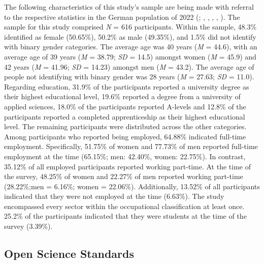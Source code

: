 \documentclass[
  12pt,
  a4paper,
  twoside]{article}
\begin{document}
The following characteristics of this study's sample are being made with referral to the respective statistics in the German population of 2022 (; , , , , ).
The sample for this study comprised \emph{N} = 616 participants. Within the sample, 48.3\% identified as female (50.65\%), 50.2\% as male (49.35\%), and 1.5\% did not identify with binary gender categories. The average age was 40 years (\emph{M} = 44.6), with an average age of 39 years (\emph{M} = 38.79; \emph{SD} = 14.5) amongst women (\emph{M} = 45.9) and 42 years (\emph{M} = 41.96; \emph{SD} = 14.23) amongst men (\emph{M} = 43.2). The average age of people not identifying with binary gender was 28 years (\emph{M} = 27.63; \emph{SD} = 11.0).
Regarding education, 31.9\% of the participants reported a university degree as their highest educational level, 19.6\% reported a degree from a university of applied sciences, 18.0\% of the participants reported A-levels and 12.8\% of the participants reported a completed apprenticeship as their highest educational level. The remaining participants were distributed across the other categories.
Among participants who reported being employed, 64.88\% indicated full-time employment.
Specifically, 51.75\% of women and 77.73\% of men reported full-time employment at the time (65.15\%; men: 42.40\%, women: 22.75\%).
In contrast, 35.12\% of all employed participants reported working part-time.
At the time of the survey, 48.25\% of women and 22.27\% of men reported working part-time (28.22\%;men = 6.16\%; women = 22.06\%).
Additionally, 13.52\% of all participants indicated that they were not employed at the time (6.63\%).
The study encompassed every sector within the occupational classification at least once. 25.2\% of the participants indicated that they were students at the time of the survey (3.39\%).

\subsection{Open Science Standards}\label{open-science-standards}
\end{document}
